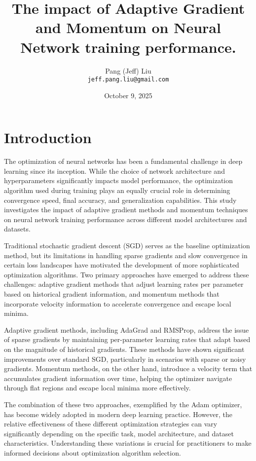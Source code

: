 \documentclass[12pt]{article}
\title{
    \LARGE The impact of Adaptive Gradient and Momentum on Neural Network training performance.
}
\author{Pang (Jeff) Liu \\ \texttt{jeff.pang.liu@gmail.com}}
\date{October 9, 2025}
\begin{document}
\maketitle

\section{Introduction}

The optimization of neural networks has been a fundamental challenge in deep learning since its inception. While the choice of network architecture and hyperparameters significantly impacts model performance, the optimization algorithm used during training plays an equally crucial role in determining convergence speed, final accuracy, and generalization capabilities. This study investigates the impact of adaptive gradient methods and momentum techniques on neural network training performance across different model architectures and datasets.

Traditional stochastic gradient descent (SGD) serves as the baseline optimization method, but its limitations in handling sparse gradients and slow convergence in certain loss landscapes have motivated the development of more sophisticated optimization algorithms. Two primary approaches have emerged to address these challenges: adaptive gradient methods that adjust learning rates per parameter based on historical gradient information, and momentum methods that incorporate velocity information to accelerate convergence and escape local minima.

Adaptive gradient methods, including AdaGrad and RMSProp, address the issue of sparse gradients by maintaining per-parameter learning rates that adapt based on the magnitude of historical gradients. These methods have shown significant improvements over standard SGD, particularly in scenarios with sparse or noisy gradients. Momentum methods, on the other hand, introduce a velocity term that accumulates gradient information over time, helping the optimizer navigate through flat regions and escape local minima more effectively.

The combination of these two approaches, exemplified by the Adam optimizer, has become widely adopted in modern deep learning practice. However, the relative effectiveness of these different optimization strategies can vary significantly depending on the specific task, model architecture, and dataset characteristics. Understanding these variations is crucial for practitioners to make informed decisions about optimization algorithm selection.
\end{document}
